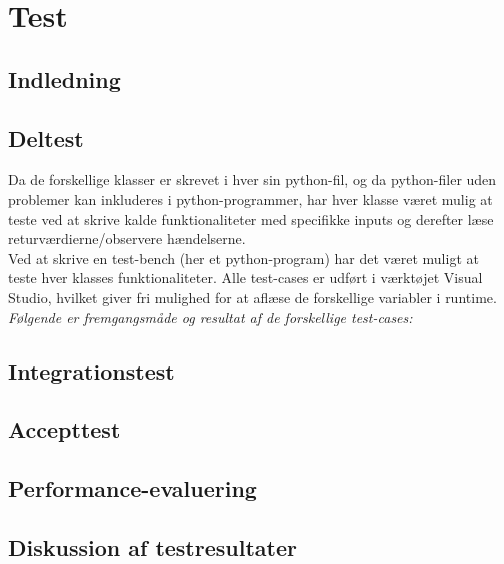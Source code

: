 \documentclass[rapport.tex]{subfiles}
\begin{document}
\section{Test}
	\subsection{Indledning}
	\subsection{Deltest}
	Da de forskellige klasser er skrevet i hver sin python-fil, og da python-filer uden problemer kan inkluderes i python-programmer, har hver klasse været mulig at teste ved at skrive kalde funktionaliteter med specifikke inputs og derefter læse returværdierne/observere hændelserne. \\
	
	Ved at skrive en test-bench (her et python-program) har det været muligt at teste hver klasses funktionaliteter. Alle test-cases er udført i værktøjet Visual Studio, hvilket giver fri mulighed for at aflæse de forskellige variabler i runtime. \textit{Følgende er fremgangsmåde og resultat af de forskellige test-cases:}
	\subsection{Integrationstest}
	\subsection{Accepttest}
	\subsection{Performance-evaluering}
	\subsection{Diskussion af testresultater}
		
\end{document}
